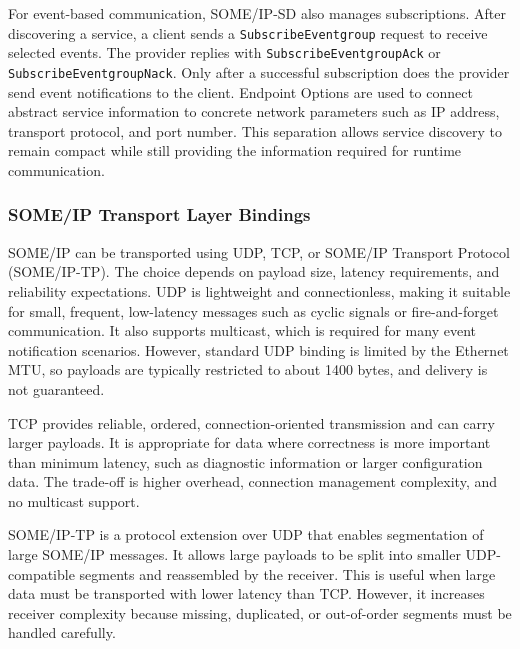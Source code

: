 For event-based communication, SOME/IP-SD also manages subscriptions. After discovering a service, a client sends a \texttt{SubscribeEventgroup} request to receive selected events. The provider replies with \texttt{SubscribeEventgroupAck} or \texttt{SubscribeEventgroupNack}. Only after a successful subscription does the provider send event notifications to the client. Endpoint Options are used to connect abstract service information to concrete network parameters such as IP address, transport protocol, and port number. This separation allows service discovery to remain compact while still providing the information required for runtime communication.

\subsubsection{SOME/IP Transport Layer Bindings}

SOME/IP can be transported using UDP, TCP, or SOME/IP Transport Protocol (SOME/IP-TP). The choice depends on payload size, latency requirements, and reliability expectations. {UDP} is lightweight and connectionless, making it suitable for small, frequent, low-latency messages such as cyclic signals or fire-and-forget communication. It also supports multicast, which is required for many event notification scenarios. However, standard UDP binding is limited by the Ethernet MTU, so payloads are typically restricted to about 1400 bytes, and delivery is not guaranteed.

{TCP} provides reliable, ordered, connection-oriented transmission and can carry larger payloads. It is appropriate for data where correctness is more important than minimum latency, such as diagnostic information or larger configuration data. The trade-off is higher overhead, connection management complexity, and no multicast support.

{SOME/IP-TP} is a protocol extension over UDP that enables segmentation of large SOME/IP messages. It allows large payloads to be split into smaller UDP-compatible segments and reassembled by the receiver. This is useful when large data must be transported with lower latency than TCP. However, it increases receiver complexity because missing, duplicated, or out-of-order segments must be handled carefully.

